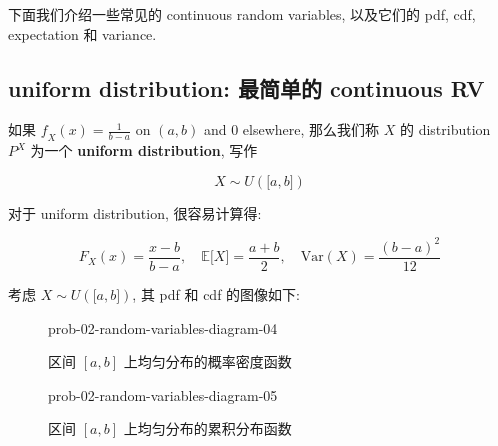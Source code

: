 下面我们介绍一些常见的 continuous random variables, 以及它们的 pdf, cdf, expectation 和 variance.

\subsection{uniform distribution: 最简单的 continuous RV}\label{uniform-distribution-ux6700ux7b80ux5355ux7684-continuous-rv}

\begin{definition}{}

如果 \(\mathit{f}_{\mathit{X}}(\mathit{x}) = \frac{1}{\mathit{b} - \mathit{a}}\) on \((\mathit{a},\mathit{b})\) and \(0\) elsewhere, 那么我们称 \(\mathit{X}\) 的 distribution \(\mathit{P}^{\mathit{X}}\) 为一个 \textbf{uniform distribution}, 写作

\[\mathit{X} \sim \mathit{U}(\lbrack\mathit{a},\mathit{b}\rbrack)\]

\end{definition}

对于 uniform distribution, 很容易计算得:

\[\mathit{F}_{\mathit{X}}(\mathit{x}) = \frac{\mathit{x} - \mathit{b}}{\mathit{b} - \mathit{a}},\quad\mathbb{E}\lbrack\mathit{X}\rbrack = \frac{\mathit{a} + \mathit{b}}{2},\quad\text{Var}(\mathit{X}) = \frac{(\mathit{b} - \mathit{a})^{2}}{12}\]

\begin{example}

考虑 \(\mathit{X} \sim \mathit{U}(\lbrack\mathit{a},\mathit{b}\rbrack)\), 其 pdf 和 cdf 的图像如下:

\begin{figure}[htbp]
\centering
\begin{qldrawing}
\csname prob-02-random-variables-diagram-04\endcsname
\end{qldrawing}

\caption{区间 \(\left\lbrack {\mathit{a},\mathit{b}} \right\rbrack\)
上均匀分布的概率密度函数}

\label{fig-prob-02-random-variables-diagram-04}

\end{figure}

\begin{figure}[htbp]
\centering
\begin{qldrawing}
\csname prob-02-random-variables-diagram-05\endcsname
\end{qldrawing}

\caption{区间 \(\left\lbrack {\mathit{a},\mathit{b}} \right\rbrack\)
上均匀分布的累积分布函数}

\label{fig-prob-02-random-variables-diagram-05}

\end{figure}

\end{example}

